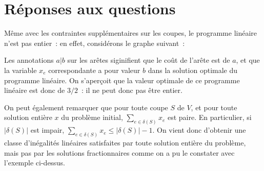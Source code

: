 \documentclass[a4paper,10pt]{article}
\begin{document}
\section{Réponses aux questions}

Même avec les contraintes supplémentaires sur les coupes, le programme linéaire n'est pas entier~: en effet, considérons le graphe suivant~:

\begin {center}
\end{center}

Les annotations $a|b$ sur les arêtes siginifient que le coût de l'arête est de $a$, et que la variable $x_e$ correspondante a pour valeur $b$ dans la solution optimale du programme linéaire. On s'aperçoit que la valeur optimale de ce programme linéaire est donc de $3/2$~: il ne peut donc pas être entier.

On peut également remarquer que pour toute coupe $S$ de $V$, et pour toute solution entière $x$ du problème initial, $\sum_{e\in\delta(S)} x_e$ est paire. En particulier, si $|\delta(S)|$ est impair, $\sum_{e\in\delta(S)} x_e \leq |\delta(S)| - 1$. On vient donc d'obtenir une classe d'inégalités linéaires satisfaites par toute solution entière du problème, mais pas par les solutions fractionnaires comme on a pu le constater avec l'exemple ci-dessus.
\end{document}
